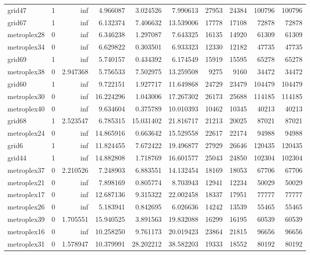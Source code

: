 \begin{longtable}{|l|r|r|r|r|r|r|r|r|r|}
grid47 & 1 & inf & 4.966087 & 3.024526 & 7.990613 & 27953 & 24384 & 100796 & 100796 \\
grid67 & 1 & inf & 6.132374 & 7.406632 & 13.539006 & 17778 & 17108 & 72878 & 72878 \\
metroplex28 & 0 & inf & 6.346238 & 1.297087 & 7.643325 & 16135 & 14920 & 61309 & 61309 \\
metroplex34 & 0 & inf & 6.629822 & 0.303501 & 6.933323 & 12330 & 12182 & 47735 & 47735 \\
grid69 & 1 & inf & 5.740157 & 0.434392 & 6.174549 & 15919 & 15595 & 65278 & 65278 \\
metroplex38 & 0 & 2.947368 & 5.756533 & 7.502975 & 13.259508 & 9275 & 9160 & 34472 & 34472 \\
grid60 & 1 & inf & 9.722151 & 1.927717 & 11.649868 & 24729 & 23479 & 104479 & 104479 \\
metroplex30 & 0 & inf & 16.224296 & 1.043006 & 17.267302 & 26173 & 25688 & 114185 & 114185 \\
metroplex40 & 0 & inf & 9.634604 & 0.375789 & 10.010393 & 10462 & 10345 & 40213 & 40213 \\
grid68 & 1 & 2.523547 & 6.785315 & 15.031402 & 21.816717 & 21213 & 20025 & 87021 & 87021 \\
metroplex24 & 0 & inf & 14.865916 & 0.663642 & 15.529558 & 22617 & 22174 & 94988 & 94988 \\
grid6 & 1 & inf & 11.824455 & 7.672422 & 19.496877 & 27929 & 26646 & 120435 & 120435 \\
grid44 & 1 & inf & 14.882808 & 1.718769 & 16.601577 & 25043 & 24850 & 102304 & 102304 \\
metroplex37 & 0 & 2.210526 & 7.248903 & 6.883551 & 14.132454 & 18169 & 18053 & 67706 & 67706 \\
metroplex21 & 0 & inf & 7.898169 & 0.805774 & 8.703943 & 12941 & 12234 & 50029 & 50029 \\
metroplex17 & 0 & inf & 12.687136 & 9.315322 & 22.002458 & 18337 & 17951 & 77777 & 77777 \\
metroplex26 & 0 & inf & 5.183941 & 0.842695 & 6.026636 & 14242 & 13539 & 55465 & 55465 \\
metroplex39 & 0 & 1.705551 & 15.940525 & 3.891563 & 19.832088 & 16299 & 16195 & 60539 & 60539 \\
metroplex16 & 0 & inf & 10.258250 & 9.761173 & 20.019423 & 23864 & 21815 & 96656 & 96656 \\
metroplex31 & 0 & 1.578947 & 10.379991 & 28.202212 & 38.582203 & 19333 & 18552 & 80192 & 80192 \\

\end{longtable}
